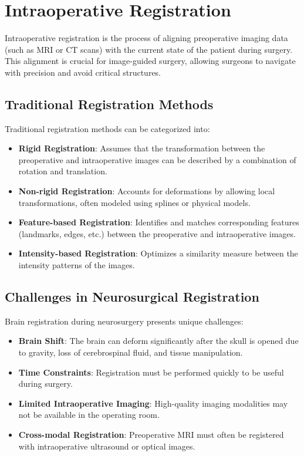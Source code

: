 \section{Intraoperative Registration}
Intraoperative registration is the process of aligning preoperative imaging data (such as MRI or CT scans) with the current state of the patient during surgery. This alignment is crucial for image-guided surgery, allowing surgeons to navigate with precision and avoid critical structures.

\subsection{Traditional Registration Methods}
Traditional registration methods can be categorized into:

\begin{itemize}
    \item \textbf{Rigid Registration}: Assumes that the transformation between the preoperative and intraoperative images can be described by a combination of rotation and translation.
    
    \item \textbf{Non-rigid Registration}: Accounts for deformations by allowing local transformations, often modeled using splines or physical models.
    
    \item \textbf{Feature-based Registration}: Identifies and matches corresponding features (landmarks, edges, etc.) between the preoperative and intraoperative images.
    
    \item \textbf{Intensity-based Registration}: Optimizes a similarity measure between the intensity patterns of the images.
\end{itemize}

\subsection{Challenges in Neurosurgical Registration}
Brain registration during neurosurgery presents unique challenges:

\begin{itemize}
    \item \textbf{Brain Shift}: The brain can deform significantly after the skull is opened due to gravity, loss of cerebrospinal fluid, and tissue manipulation.
    
    \item \textbf{Time Constraints}: Registration must be performed quickly to be useful during surgery.
    
    \item \textbf{Limited Intraoperative Imaging}: High-quality imaging modalities may not be available in the operating room.
    
    \item \textbf{Cross-modal Registration}: Preoperative MRI must often be registered with intraoperative ultrasound or optical images.
\end{itemize}

